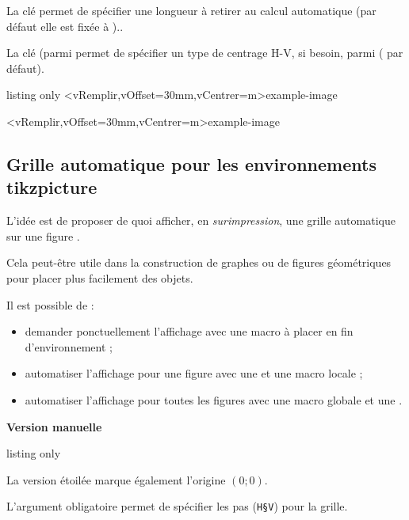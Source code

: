 \documentclass[french,11pt,a4paper]{article}
\begin{document}
La clé  permet de spécifier une longueur à retirer au calcul automatique (par défaut elle est fixée à \MontreCode{0pt})..

La clé  (parmi  permet de spécifier un type de centrage H-V, si besoin, parmi  ( par défaut).

\begin{DemoCode}{listing only}
\InsererImage<vRemplir,vOffset=30mm,vCentrer=m>{example-image}
\end{DemoCode}

\InsererImage<vRemplir,vOffset=30mm,vCentrer=m>{example-image}

\subsection{Grille automatique pour les environnements tikzpicture}

L'idée est de proposer de quoi afficher, en \textit{surimpression}, une grille automatique sur une figure .

Cela peut-être utile dans la construction de graphes ou de figures géométriques pour placer plus facilement des objets.

\smallskip

Il est possible de :

\begin{itemize}
	\item demander ponctuellement l'affichage avec une macro à placer en fin d'environnement ;
	\item automatiser l'affichage pour une figure avec une  et une macro locale ;
	\item automatiser l'affichage pour toutes les figures avec une macro globale et une .
\end{itemize}

\textbf{\large Version manuelle}

\begin{DemoCode}{listing only}
\end{DemoCode}

La version étoilée marque également l'origine $(0;0)$.

L'argument obligatoire permet de spécifier les pas (\texttt{H§V}) pour la grille.
\end{document}
